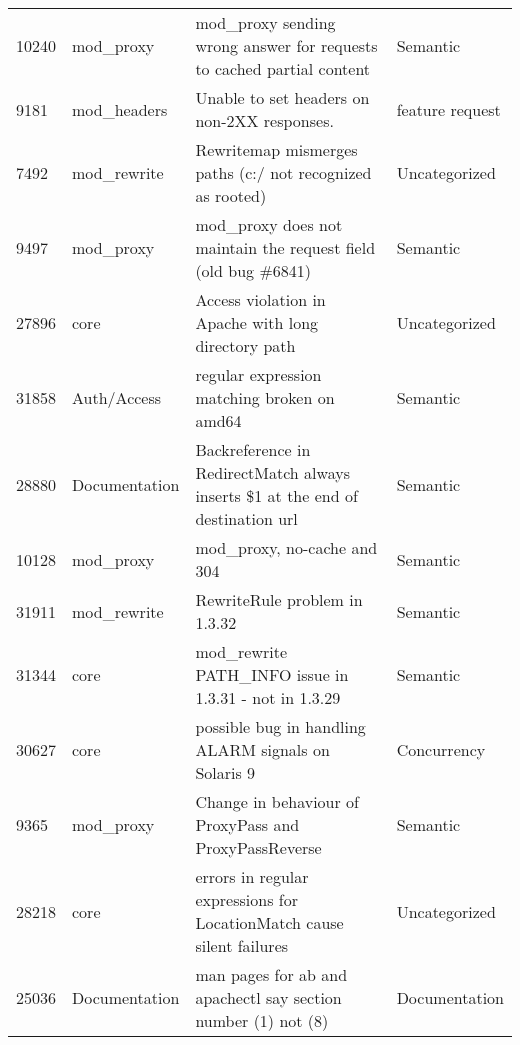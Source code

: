 \begin{longtable}[c]{llll}
10240  & mod\_proxy         & mod\_proxy sending wrong answer for requests to cached partial content                                         & Semantic          \\
9181   & mod\_headers       & Unable to set headers on non-2XX responses.                                                                    & feature request   \\
7492   & mod\_rewrite       & Rewritemap mismerges paths (c:/ not recognized as rooted)                                                      & Uncategorized     \\
9497   & mod\_proxy         & mod\_proxy does not maintain the request field (old bug \#6841) & Semantic\\
27896  & core               & Access violation in Apache with long directory path                                                            & Uncategorized     \\
31858  & Auth/Access        & regular expression matching broken on amd64                                                                    & Semantic          \\
28880  & Documentation      & Backreference in RedirectMatch always inserts \$1 at the end of destination url                                & Semantic          \\
10128  & mod\_proxy         & mod\_proxy, no-cache and 304                                                                                   & Semantic          \\
31911  & mod\_rewrite       & RewriteRule problem in 1.3.32                                                                                  & Semantic          \\
31344  & core               & mod\_rewrite PATH\_INFO issue in 1.3.31 - not in 1.3.29                                                        & Semantic          \\
30627  & core               & possible bug in handling ALARM signals on Solaris 9                                                            & Concurrency       \\
9365   & mod\_proxy         & Change in behaviour of ProxyPass and ProxyPassReverse                                                          & Semantic          \\
28218  & core               & errors in regular expressions for LocationMatch cause silent failures                                          & Uncategorized     \\
25036  & Documentation      & man pages for ab and apachectl say section number (1) not (8)                                                  & Documentation     \\

\end{longtable}
